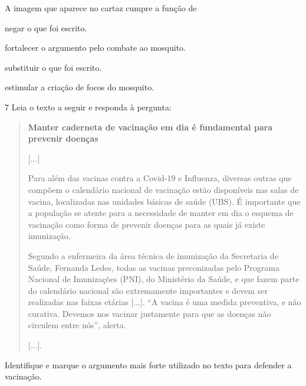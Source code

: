 \pagebreak
A imagem que aparece no cartaz cumpre a função de

\begin{escolha}
\item negar o que foi escrito.

\item fortalecer o argumento pelo combate ao mosquito.

\item substituir o que foi escrito.

\item estimular a criação de focos do mosquito.
\end{escolha}


\num{7} Leia o texto a seguir e responda à pergunta:

\begin{quote}
\textbf{Manter caderneta de vacinação em dia é fundamental para prevenir
doenças}

{[}...{]}

Para além das vacinas contra a Covid-19 e Influenza, diversas outras que
compõem o calendário nacional de vacinação estão disponíveis nas salas
de vacina, localizadas nas unidades básicas de saúde (UBS). É importante
que a população se atente para a necessidade de manter em dia o esquema
de vacinação como forma de prevenir doenças para as quais já existe
imunização.

Segundo a enfermeira da área técnica de imunização da Secretaria de
Saúde, Fernanda Ledes, todas as vacinas preconizadas pelo Programa
Nacional de Imunizações (PNI), do Ministério da Saúde, e que fazem parte
do calendário nacional são extremamente importantes e devem ser
realizadas nas faixas etárias {[}...{]}. “A vacina é uma medida
preventiva, e não curativa. Devemos nos vacinar justamente para que as
doenças não circulem entre nós”, alerta.

{[}...{]}.

\end{quote}

Identifique e marque o argumento mais forte utilizado no texto para defender a
vacinação.

